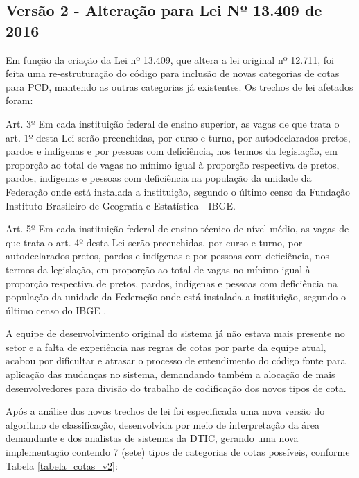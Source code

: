\subsection{Versão 2 - Alteração para Lei Nº 13.409 de 2016 }
\label{versao2}
 Em função da criação da Lei nº 13.409, que altera a lei original nº 12.711, foi feita uma re-estruturação do código para inclusão de novas categorias de cotas para \gls{PCD}, mantendo as outras categorias já existentes. Os trechos de lei afetados foram:
\begin{citacao}
Art. 3º Em cada instituição federal de ensino superior, as vagas de que trata o art. 1º desta Lei serão preenchidas, por curso e turno, por autodeclarados pretos, pardos e indígenas e por pessoas com deficiência, nos termos da legislação, em proporção ao total de vagas no mínimo igual à proporção respectiva de pretos, pardos, indígenas e pessoas com deficiência na população da unidade da Federação onde está instalada a instituição, segundo o último censo da Fundação Instituto Brasileiro de Geografia e Estatística - IBGE.

Art. 5º Em cada instituição federal de ensino técnico de nível médio, as vagas de que trata o art. 4º desta Lei serão preenchidas, por curso e turno, por autodeclarados pretos, pardos e indígenas e por pessoas com deficiência, nos termos da legislação, em proporção ao total de vagas no mínimo igual à proporção respectiva de pretos, pardos, indígenas e pessoas com deficiência na população da unidade da Federação onde está instalada a instituição, segundo o último censo do IBGE \cite{leicotas2}.
\end{citacao}

A equipe de desenvolvimento original do sistema já não estava mais presente no setor e a falta de experiência nas regras de cotas por parte da equipe atual, acabou por dificultar e atrasar o processo de entendimento do código fonte para aplicação das mudanças no sistema,  demandando também a alocação de mais desenvolvedores para divisão do trabalho de codificação dos novos tipos de cota.

Após a análise dos novos trechos de lei foi especificada uma nova versão do algoritmo de classificação, desenvolvida por meio de interpretação da área demandante e dos analistas de sistemas da \gls{DTIC}, gerando uma nova implementação contendo 7 (sete) tipos de categorias de cotas possíveis, conforme Tabela \ref{tabela_cotas_v2}:



